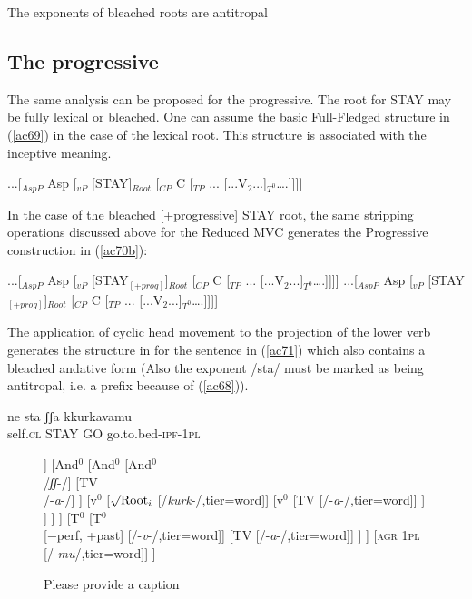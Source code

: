 \documentclass[output=paper]{langscibook}
\begin{document}
\ea\label{ac68}
The exponents of bleached roots are antitropal
\z

\subsection{The progressive}

The same analysis can be proposed for the progressive.  The root for STAY may be fully lexical or bleached. One can assume the basic Full-Fledged structure in (\ref{ac69}) in the case of the lexical root.  This structure is associated with the inceptive meaning.

\ea \label{ac69}...[$_{AspP}$ Asp [$_{vP}$ [STAY]$_{Root}$ [$_{CP}$ C [$_{TP}$ ... [...V$_2$...]$_{T^0}$….]]]]
\z

In the case of the bleached [+progressive] STAY root, the same stripping operations discussed above for the Reduced MVC generates the Progressive construction in (\ref{ac70b}):

\ea \label{ac70}
    \ea \label{ac70a}...[$_{AspP}$ Asp [$_{vP}$ [STAY$_{[+prog]}$]$_{Root}$ [$_{CP}$ C [$_{TP}$ ... [...V$_2$...]$_{T^0}$….]]]]
    \ex \label{ac70b}...[$_{AspP}$ Asp \sout{[$_{vP}$} [STAY$_{[+prog]}$]$_{Root}$ \sout{[$_{CP}$ C [$_{TP}$ ...} [...V$_2$...]$_{T^0}$….]]]]
    \z
\z

The application of cyclic head movement to the projection of the lower verb generates the structure in  for the sentence in (\ref{ac71}) which also contains a bleached andative form (Also the exponent /sta/ must be marked as being antitropal, i.e. a prefix because of (\ref{ac68})).

\ea \label{ac71}
    \gll ne     sta    ʃʃa  kkurkavamu\\
   self.\textsc{cl} STAY GO  go.to.bed-\textsc{ipf}-\textsc{1pl}\\
\z

\begin{figure}
  \caption{\label{ac72}\color{red}Please provide a caption}
  \begin{forest}
  	[T$^0$
  		[T$^0$
	  		[$\surd{} + \text{prog}$
	  			[$\surd{} + \text{prog}$
	  				[$\surd{} + \text{prog}$\\/\textit{st}-/]
	  				[TV\\/-\textit{a}-/]
	  			]
	  			[And$^0$
	  				[And$^0$
	  					[And$^0$\\/\textit{ʃʃ}-/]
	  					[TV\\/-\textit{a}-/]
	  				]
	  				[v$^0$
	  					[$\surd\text{Root}_i$ [/\textit{kurk}-/,tier=word]]
	  					[v$^0$
	  						[TV [/-\textit{a}-/,tier=word]]
	  					]
	  				]
	  			]
	  		]
	  		[T$^0$
	  			[T$^0$\\{[−perf, +past]} [/-\textit{v}-/,tier=word]]
	  			[TV [/-\textit{a}-/,tier=word]]
	  		]
  		]
  		[\textsc{agr 1pl} [/-\textit{mu}/,tier=word]]
  	]
  \end{forest}
\end{figure}
\end{document}
